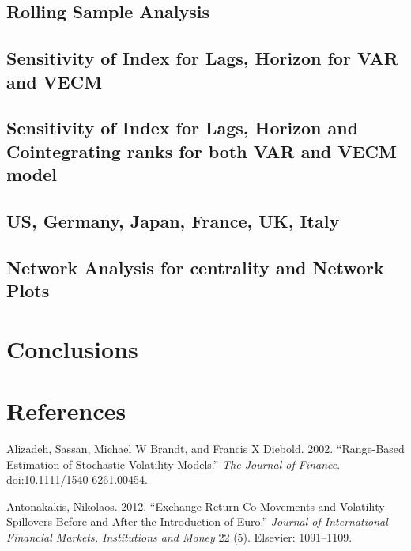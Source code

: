 \documentclass[]{elsarticle} %
\begin{document}
\subsection{Rolling Sample Analysis}\label{rolling-sample-analysis}

\subsection{Sensitivity of Index for Lags, Horizon for VAR and
VECM}\label{sensitivity-of-index-for-lags-horizon-for-var-and-vecm}

\subsection{Sensitivity of Index for Lags, Horizon and Cointegrating
ranks for both VAR and VECM
model}\label{sensitivity-of-index-for-lags-horizon-and-cointegrating-ranks-for-both-var-and-vecm-model}

\subsection{US, Germany, Japan, France, UK,
Italy}\label{us-germany-japan-france-uk-italy}

\subsection{Network Analysis for centrality and Network
Plots}\label{network-analysis-for-centrality-and-network-plots}

\section{Conclusions}\label{conclusions}

\section*{References}\label{references}

\hypertarget{refs}{}
\hypertarget{ref-Alizadeh2002}{}
Alizadeh, Sassan, Michael W Brandt, and Francis X Diebold. 2002.
``Range-Based Estimation of Stochastic Volatility Models.'' \emph{The
Journal of Finance}.
doi:\href{https://doi.org/10.1111/1540-6261.00454}{10.1111/1540-6261.00454}.

\hypertarget{ref-antonakakis2012exchange}{}
Antonakakis, Nikolaos. 2012. ``Exchange Return Co-Movements and
Volatility Spillovers Before and After the Introduction of Euro.''
\emph{Journal of International Financial Markets, Institutions and
Money} 22 (5). Elsevier: 1091--1109.
\end{document}
